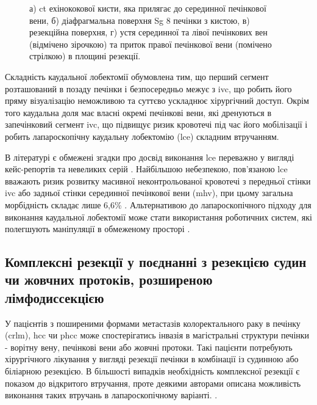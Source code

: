 \begin{refsection}
\begin{figure}[htbp]
\medskip
\small
а) \acrshort{ct} ехінококової кисти, яка прилягає до  серединної печінкової вени, б) діафрагмальна поверхня Sg 8 печінки з кистою, в) резекційна поверхня, г) устя серединної та лівої печінкових вен (відмічено зірочкою) та приток правої печінкової вени (помічено стрілкою) в площині резекції.

\end{figure}





Складність каудальної лобектомії обумовлена тим, що перший сегмент розташований в позаду печінки і безпосередньо межує з \acrshort{ivc}, що робить його пряму візуалізацію неможливою та суттєво ускладнює хірургічний доступ. Окрім того каудальна доля має власні окремі печінкові вени, які дренуються в запечінковий сегмент \acrshort{ivc}, що підвищує ризик кровотечі під час його мобілізації і робить лапароскопічну каудальну лобектомію (\acrshort{lce}) складним втручанням. 
    
В літературі є обмежені згадки про досвід виконання \acrshort{lce} переважно у вигляді кейс-репортів та невеликих серій \cite{Machado2018, Cheung2016, Koh2017, Jin2018}. Найбільшою небезпекою, пов'язаною \acrshort{lce} вважають ризик розвитку масивної неконтрольованої кровотечі з передньої стінки \acrshort{ivc} або задньої стінки серединної печінкової вени (\acrshort{mhv}), при цьому загальна морбідність складає лише 6,6\% \cite{Araki2018}. Альтернативою до лапароскопічного підходу для виконання каудальної лобектомії може стати використання роботичних систем, які полегшують маніпуляції в обмеженому просторі \cite{Marino2018a}.

\subsection[Комплексні резекції]{Комплексні резекції у поєднанні з резекцією судин чи жовчних протоків, розширеною лімфодиссекцією}

У  пацієнтів з поширеними формами метастазів колоректального раку в печінку (\acrshort{crlm}), \acrshort{hcc} чи \acrshort{phcc}  може спостерігатись інвазія в магістральні структури печінки - ворітну вену, печінкові вени або жовчні протоки. Такі пацієнти потребують хірургічного лікування у вигляді резекції печінки в комбінації із судинною або біліарною резекцією. В більшості випадків необхідність комплексної резекції є показом до відкритого втручання, проте деякими авторами описана можливість виконання таких втручань в лапароскопічному варіанті. \cite{Kobayashi2015, Tardu2016, Procopio2020, Matsukuma2020}.


\end{refsection}
